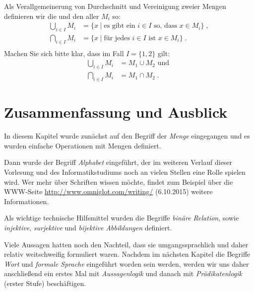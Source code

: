 Als Verallgemeinerung von Durchschnitt und Vereinigung zweier Mengen definieren
wir die 
und den 
aller $M_i$ so:
%
\begin{align*}
  \bigcup_{i\in I} M_i &= \{ x \mid \text{es gibt ein } i\in I \text{ so, dass } x\in  M_i \}  \;,\\
  \bigcap_{i\in I} M_i &= \{ x \mid \text{für jedes } i\in I \text{ ist } x\in  M_i \} \;.\\
\end{align*}
%
Machen Sie sich bitte klar, dass im Fall $I=\{1,2\}$ gilt:
\begin{align*}
  \bigcup_{i\in I} M_i &= M_1 \cup M_2 \text{ und }\\
  \bigcap_{i\in I} M_i &= M_1 \cap M_2 \;.
\end{align*}

\section*{Zusammenfassung und Ausblick}

In diesem Kapitel wurde zunächst auf den Begriff der \emph{Menge}
eingegangen und es wurden einfache Operationen mit Mengen definiert.

Dann wurde der Begriff \emph{Alphabet} eingeführt, der im weiteren
Verlauf dieser Vorlesung und des Informatikstudiums noch an vielen
Stellen eine Rolle spielen wird.
%
Wer mehr über Schriften wissen möchte, findet zum Beispiel über die
WWW-Seite \url{http://www.omniglot.com/writing/} (6.10.2015) weitere
Informationen.

Als wichtige technische Hilfsmittel wurden die Begriffe \emph{binäre
  Relation}, sowie \emph{injektive}, \emph{surjektive} und
\emph{bijektive Abbildungen} definiert.

Viele Aussagen hatten noch den Nachteil, dass sie umgangssprachlich
und daher relativ weitschweifig formuliert waren.
%
Nachdem im nächsten Kapitel die Begriffe \emph{Wort} und \emph{formale
  Sprache} eingeführt worden sein werden, werden wir uns daher
anschließend ein erstes Mal mit \emph{Aussagenlogik} und danach mit
\emph{Prädikatenlogik} (erster Stufe) beschäftigen.

\cleardoublepage

